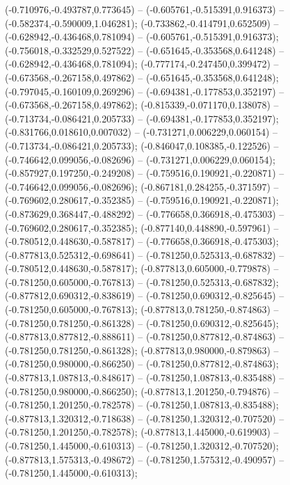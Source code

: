  (-0.710976,-0.493787,0.773645) -- (-0.605761,-0.515391,0.916373) -- (-0.582374,-0.590009,1.046281);
 (-0.733862,-0.414791,0.652509) -- (-0.628942,-0.436468,0.781094) -- (-0.605761,-0.515391,0.916373);
 (-0.756018,-0.332529,0.527522) -- (-0.651645,-0.353568,0.641248) -- (-0.628942,-0.436468,0.781094);
 (-0.777174,-0.247450,0.399472) -- (-0.673568,-0.267158,0.497862) -- (-0.651645,-0.353568,0.641248);
 (-0.797045,-0.160109,0.269296) -- (-0.694381,-0.177853,0.352197) -- (-0.673568,-0.267158,0.497862);
 (-0.815339,-0.071170,0.138078) -- (-0.713734,-0.086421,0.205733) -- (-0.694381,-0.177853,0.352197);
 (-0.831766,0.018610,0.007032) -- (-0.731271,0.006229,0.060154) -- (-0.713734,-0.086421,0.205733);
 (-0.846047,0.108385,-0.122526) -- (-0.746642,0.099056,-0.082696) -- (-0.731271,0.006229,0.060154);
 (-0.857927,0.197250,-0.249208) -- (-0.759516,0.190921,-0.220871) -- (-0.746642,0.099056,-0.082696);
 (-0.867181,0.284255,-0.371597) -- (-0.769602,0.280617,-0.352385) -- (-0.759516,0.190921,-0.220871);
 (-0.873629,0.368447,-0.488292) -- (-0.776658,0.366918,-0.475303) -- (-0.769602,0.280617,-0.352385);
 (-0.877140,0.448890,-0.597961) -- (-0.780512,0.448630,-0.587817) -- (-0.776658,0.366918,-0.475303);
 (-0.877813,0.525312,-0.698641) -- (-0.781250,0.525313,-0.687832) -- (-0.780512,0.448630,-0.587817);
 (-0.877813,0.605000,-0.779878) -- (-0.781250,0.605000,-0.767813) -- (-0.781250,0.525313,-0.687832);
 (-0.877812,0.690312,-0.838619) -- (-0.781250,0.690312,-0.825645) -- (-0.781250,0.605000,-0.767813);
 (-0.877813,0.781250,-0.874863) -- (-0.781250,0.781250,-0.861328) -- (-0.781250,0.690312,-0.825645);
 (-0.877813,0.877812,-0.888611) -- (-0.781250,0.877812,-0.874863) -- (-0.781250,0.781250,-0.861328);
 (-0.877813,0.980000,-0.879863) -- (-0.781250,0.980000,-0.866250) -- (-0.781250,0.877812,-0.874863);
 (-0.877813,1.087813,-0.848617) -- (-0.781250,1.087813,-0.835488) -- (-0.781250,0.980000,-0.866250);
 (-0.877813,1.201250,-0.794876) -- (-0.781250,1.201250,-0.782578) -- (-0.781250,1.087813,-0.835488);
 (-0.877813,1.320312,-0.718638) -- (-0.781250,1.320312,-0.707520) -- (-0.781250,1.201250,-0.782578);
 (-0.877813,1.445000,-0.619903) -- (-0.781250,1.445000,-0.610313) -- (-0.781250,1.320312,-0.707520);
 (-0.877813,1.575313,-0.498672) -- (-0.781250,1.575312,-0.490957) -- (-0.781250,1.445000,-0.610313);
